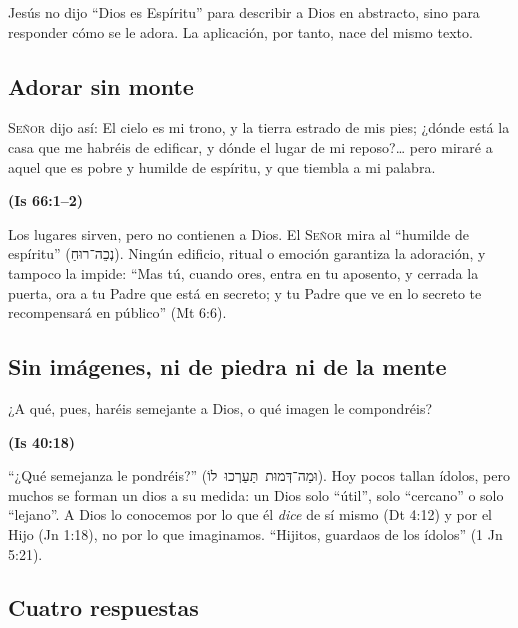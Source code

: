 \documentclass[11pt,letterpaper]{article}
\newcommand{\heb}[1]{\mbox{\foreignlanguage{hebrew}{#1}}}
\newcommand{\SENOR}{\textsc{Señor}}
\newcommand{\fuente}[1]{\par\hfill{\upshape\bfseries\small\textcolor{azul}{#1}}}
\begin{document}
Jesús no dijo ``Dios es Espíritu'' para describir a Dios en abstracto, sino para responder cómo se le adora. La aplicación, por tanto, nace del mismo texto.

\subsection{Adorar sin monte}

\begin{cita}\SENOR{} dijo así: El cielo es mi trono, y la tierra estrado de mis pies; ¿dónde está la casa que me habréis de edificar, y dónde el lugar de mi reposo?\ldots{} pero miraré a aquel que es pobre y humilde de espíritu, y que tiembla a mi palabra.\fuente{(Is 66:1--2)}\end{cita}

Los lugares sirven, pero no contienen a Dios. El \SENOR{} mira al ``humilde de espíritu'' (\heb{נְכֵה־רוּחַ}). Ningún edificio, ritual o emoción garantiza la adoración, y tampoco la impide: ``Mas tú, cuando ores, entra en tu aposento, y cerrada la puerta, ora a tu Padre que está en secreto; y tu Padre que ve en lo secreto te recompensará en público'' (Mt 6:6).

\subsection{Sin imágenes, ni de piedra ni de la mente}

\begin{cita}¿A qué, pues, haréis semejante a Dios, o qué imagen le compondréis?\fuente{(Is 40:18)}\end{cita}

``¿Qué semejanza le pondréis?'' (\heb{וּמַה־דְּמוּת תַּעַרְכוּ לוֹ}). Hoy pocos tallan ídolos, pero muchos se forman un dios a su medida: un Dios solo ``útil'', solo ``cercano'' o solo ``lejano''. A Dios lo conocemos por lo que él \emph{dice} de sí mismo (Dt 4:12) y por el Hijo (Jn 1:18), no por lo que imaginamos. ``Hijitos, guardaos de los ídolos'' (1 Jn 5:21).

\subsection{Cuatro respuestas}
\end{document}

